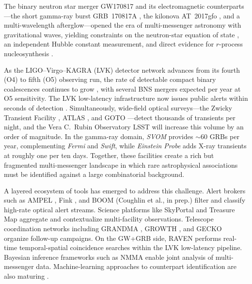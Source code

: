 \documentclass[twocolumn]{article}
\begin{document}
The binary neutron star merger GW170817 \citep{Abbott2017a, Abbott2017b} and its electromagnetic counterparts---the short gamma-ray burst GRB~170817A \citep{Goldstein2017, Abbott2017c}, the kilonova AT~2017gfo \citep{Coulter2017, Kasen2017, Villar2017}, and a multi-wavelength afterglow---opened the era of multi-messenger astronomy with gravitational waves, yielding constraints on the neutron-star equation of state \citep{Dietrich2020}, an independent Hubble constant measurement, and direct evidence for $r$-process nucleosynthesis \citep{Lattimer1974, Siegel2019, Levan2024}.

As the LIGO--Virgo--KAGRA (LVK) detector network advances from its fourth (O4) to fifth (O5) observing run, the rate of detectable compact binary coalescences continues to grow \citep{Abbott2020, GWTC4, GWTC4pop}, with several BNS mergers expected per year at O5 sensitivity. The LVK low-latency infrastructure now issues public alerts within seconds of detection \citep{Chaudhary2024, LVK2019lowlatency}. Simultaneously, wide-field optical surveys---the Zwicky Transient Facility \citep[ZTF;][]{Bellm2019, Graham2019}, ATLAS \citep{Tonry2018}, and GOTO \citep{Steeghs2022}---detect thousands of transients per night, and the Vera C.\ Rubin Observatory LSST \citep{Ivezic2019} will increase this volume by an order of magnitude. In the gamma-ray domain, \textit{SVOM} \citep{Wei2016} provides ${\sim}60$ GRBs per year, complementing \textit{Fermi} and \textit{Swift}, while \textit{Einstein Probe} \citep{EinsteinProbe2025} adds X-ray transients at roughly one per ten days. Together, these facilities create a rich but fragmented multi-messenger landscape in which rare astrophysical associations must be identified against a large combinatorial background.

A layered ecosystem of tools has emerged to address this challenge. Alert brokers such as AMPEL \citep{Nordin2019}, Fink \citep{Moller2021}, and BOOM (Coughlin et al., in prep.) filter and classify high-rate optical alert streams. Science platforms like SkyPortal \citep{Coughlin2023} and Treasure Map \citep{Wyatt2020} aggregate and contextualize multi-facility observations. Telescope coordination networks including GRANDMA \citep{Antier2020}, GROWTH \citep{Coughlin2019a}, and GECKO \citep{Kim2022} organize follow-up campaigns. On the GW+GRB side, RAVEN \citep{Urban2016} performs real-time temporal-spatial coincidence searches within the LVK low-latency pipeline. Bayesian inference frameworks such as NMMA \citep{Pang2023} enable joint analysis of multi-messenger data. Machine-learning approaches to counterpart identification are also maturing \citep{Sravan2024}.
\end{document}
